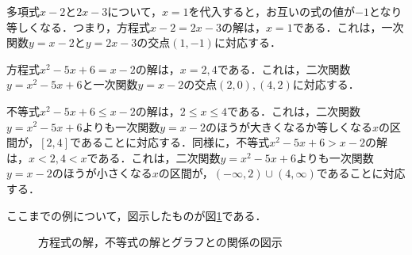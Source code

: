 \begin{example*}
	多項式$x-2$と$2x-3$について，$x = 1$を代入すると，お互いの式の値が$-1$となり等しくなる．つまり，方程式$x-2 = 2x-3$の解は，$x = 1$である．これは，一次関数$y = x-2$と$y = 2x-3$の交点$(1, -1)$に対応する．
\end{example*}
\begin{example*}
	方程式$x^2-5x+6 = x-2$の解は，$x = 2, 4$である．これは，二次関数$y = x^2-5x+6$と一次関数$y = x-2$の交点$(2, 0), (4, 2)$に対応する．
\end{example*}
\begin{example*}
	不等式$x^2-5x+6 \leq x-2$の解は，$2 \leq x \leq 4$である．これは，二次関数$y = x^2-5x+6$よりも一次関数$y = x-2$のほうが大きくなるか等しくなる$x$の区間が，$\left[2, 4\right]$であることに対応する．同様に，不等式$x^2-5x+6 > x-2$の解は，$x < 2, 4 < x$である．これは，二次関数$y = x^2-5x+6$よりも一次関数$y = x-2$のほうが小さくなる$x$の区間が，$\left(-\infty, 2\right) \cup \left(4, \infty\right)$であることに対応する．
\end{example*}

ここまでの例について，図示したものが図\ref{fig:equation}である．

\vfill
\begin{figure}[!h]
	\caption{方程式の解，不等式の解とグラフとの関係の図示}
	\label{fig:equation}
\end{figure}
\clearpage

